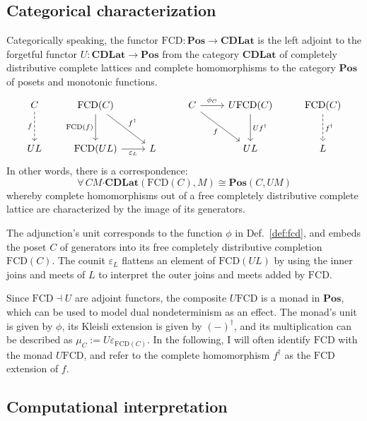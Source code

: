 \documentclass[11pt,oneside]{book}
\theoremstyle{definition}
\newcommand{\bdot}{\boldsymbol{\cdot}}
\begin{document}

\subsection{Categorical characterization} %

Categorically speaking,
the functor
$\mathrm{FCD} : \mathbf{Pos} \rightarrow \mathbf{CDLat}$
is the left adjoint to the forgetful functor
$U : \mathbf{CDLat} \rightarrow \mathbf{Pos}$
from the category $\mathbf{CDLat}$
of completely distributive complete lattices and complete homomorphisms
to the category $\mathbf{Pos}$
of posets and monotonic functions.
\[
  \begin{tikzcd}[row sep=large]
    C \ar[d, "f"', dashed] &
    \mathrm{FCD}(C) \ar[d, "\mathrm{FCD}(f)"'] \ar[dr, "f^\dagger"] &
    &
    C \ar[r, "\phi_C"] \ar[dr, "f"'] &
    U \mathrm{FCD}(C) \ar[d, "U f^\dagger"] &
    \mathrm{FCD}(C) \ar[d, "f^\dagger", dashed]
    \\
    U L &
    \mathrm{FCD}(U L) \ar[r, "\varepsilon_L"'] &
    L & & U L & L
  \end{tikzcd}
\]
In other words,
there is a correspondence:
\[
  \forall \, C M \bdot
  \mathbf{CDLat}(\mathrm{FCD}(C), M) \cong
  \mathbf{Pos}(C, U M)
\]
whereby complete homomorphisms out of a
free completely distributive complete lattice
are characterized by
the image of its generators.

The adjunction's unit corresponds to the function $\phi$
in Def.~\ref{def:fcd},
and embeds the poset $C$ of generators into
its free completely distributive completion $\mathrm{FCD}(C)$.
The counit $\varepsilon_L$ flattens an element of $\mathrm{FCD}(U L)$
by using the inner joins and meets of $L$ to interpret
the outer joins and meets added by $\mathrm{FCD}$.

Since $\mathrm{FCD} \dashv U$ are adjoint functors,
the composite $U \mathrm{FCD}$
is a monad in $\mathbf{Pos}$,
which can be used to model dual nondeterminism
as an effect.
The monad's unit is given by $\phi$,
its Kleisli extension is given by $(-)^\dagger$,
and its multiplication can be described as
$\mu_C := U \varepsilon_{\mathrm{FCD}(C)}$.
In the following,
I will often identify $\mathrm{FCD}$ with
the monad $U \mathrm{FCD}$,
and refer to the complete homomorphism
$f^\dagger$ as the $\mathrm{FCD}$ extension of $f$.


\subsection{Computational interpretation}
\end{document}
